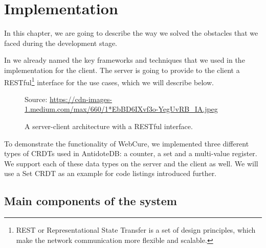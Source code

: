 \chapter{Implementation}
\label{Implementation}

In this chapter, we are going to describe the way we solved the obstacles that we faced during the development stage.

In  we already named the key frameworks and techniques that we used in the implementation for the client. The server is going to provide to the client a RESTful\footnote{REST or Representational State Transfer is a set of design principles, which make the network communication more flexible and scalable\cite{40}.} interface for the use cases, which we will describe below.

\begin{figure}[!htb]
    \begin{center}
    \setlength{\fboxsep}{4pt}%
    \setlength{\fboxrule}{1pt}%
    {\scriptsize%
     Source: \url{https://cdn-images-1.medium.com/max/660/1*EbBD6IXvf3o-YegUvRB_IA.jpeg}}
    \caption {A server-client architecture with a RESTful interface.}
    \label{fig:design1}
\end{center}
\end{figure}

To demonstrate the functionality of WebCure, we implemented three different types of CRDTs used in AntidoteDB: a counter, a set and a multi-value register. We support each of these data types on the server and the client as well. We will use a Set CRDT as an example for code listings introduced further.

\section{Main components of the system}
\label{sysmaincomponents}


